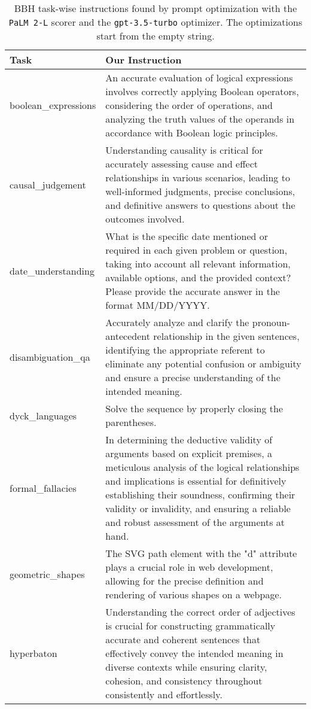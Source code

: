 \newpage
\begin{table}[H]
\scriptsize
\caption{BBH task-wise instructions found by prompt optimization with the \texttt{PaLM 2-L} scorer and the \texttt{gpt-3.5-turbo} optimizer.
The optimizations start from the empty string.
}
\centering
\begin{tabular}{P{2.3cm}P{11.6cm}}
\toprule
Task & Our Instruction \\
\midrule
boolean\_expressions & An accurate evaluation of logical expressions involves correctly applying Boolean operators, considering the order of operations, and analyzing the truth values of the operands in accordance with Boolean logic principles. \\ [2ex]
causal\_judgement & Understanding causality is critical for accurately assessing cause and effect relationships in various scenarios, leading to well-informed judgments, precise conclusions, and definitive answers to questions about the outcomes involved. \\ [2ex]
date\_understanding & What is the specific date mentioned or required in each given problem or question, taking into account all relevant information, available options, and the provided context? Please provide the accurate answer in the format MM/DD/YYYY. \\ [2ex]
disambiguation\_qa & Accurately analyze and clarify the pronoun-antecedent relationship in the given sentences, identifying the appropriate referent to eliminate any potential confusion or ambiguity and ensure a precise understanding of the intended meaning. \\ [2ex]
dyck\_languages & Solve the sequence by properly closing the parentheses. \\ [2ex]
formal\_fallacies & In determining the deductive validity of arguments based on explicit premises, a meticulous analysis of the logical relationships and implications is essential for definitively establishing their soundness, confirming their validity or invalidity, and ensuring a reliable and robust assessment of the arguments at hand. \\ [2ex]
geometric\_shapes & The SVG path element with the "d" attribute plays a crucial role in web development, allowing for the precise definition and rendering of various shapes on a webpage. \\ [2ex]
hyperbaton & Understanding the correct order of adjectives is crucial for constructing grammatically accurate and coherent sentences that effectively convey the intended meaning in diverse contexts while ensuring clarity, cohesion, and consistency throughout consistently and effortlessly. \\ [2ex]

\end{tabular}
\end{table}
